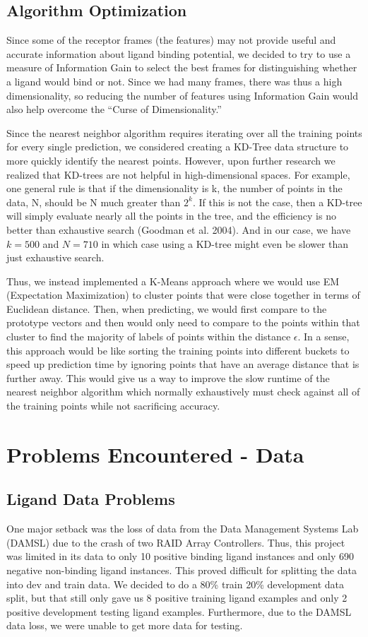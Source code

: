 \documentclass[11pt,letterpaper]{article}
\begin{document}
\subsection{Algorithm Optimization}
Since some of the receptor frames (the features) may not provide useful and accurate information about ligand binding potential, we decided to try to use a measure of Information Gain to select the best frames for distinguishing whether a ligand would bind or not.  Since we had many frames, there was thus a high dimensionality, so reducing the number of features using Information Gain would also help overcome the ``Curse of Dimensionality.''  

Since the nearest neighbor algorithm requires iterating over all the training points for every single prediction, we considered creating a KD-Tree data structure to more quickly identify the nearest points.  However, upon further research we realized that KD-trees are not helpful in high-dimensional spaces.  For example, one general rule is that if the dimensionality is k, the number of points in the data, N, should be N much greater than $2^k$. If this is not the case, then a KD-tree will simply evaluate nearly all the points in the tree, and the efficiency is no better than exhaustive search (Goodman et al. 2004).  And in our case, we have $k=500$ and $N=710$ in which case using a KD-tree might even be slower than just exhaustive search.

Thus, we instead implemented a K-Means approach where we would use EM (Expectation Maximization) to cluster points that were close together in terms of Euclidean distance.  Then, when predicting, we would first compare to the prototype vectors and then would only need to compare to the points within that cluster to find the majority of labels of points within the distance $\epsilon$.  In a sense, this approach would be like sorting the training points into different buckets to speed up prediction time by ignoring points that have an average distance that is further away.  This would give us a way to improve the slow runtime of the nearest neighbor algorithm which normally exhaustively must check against all of the training points while not sacrificing accuracy.

\section{Problems Encountered - Data}
\subsection{Ligand Data Problems}
One major setback was the loss of data from the Data Management Systems Lab (DAMSL) due to the crash of two RAID Array Controllers.  Thus, this project was limited in its data to only 10 positive binding ligand instances and only 690 negative non-binding ligand instances.  This proved difficult for splitting the data into dev and train data.  We decided to do a 80\% train 20\% development data split, but that still only gave us 8 positive training ligand examples and only 2 positive development testing ligand examples.  Furthermore, due to the DAMSL data loss, we were unable to get more data for testing.  
\end{document}
